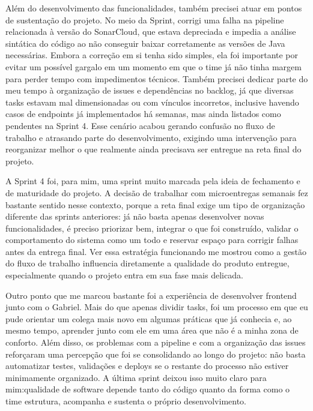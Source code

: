 \indent Além do desenvolvimento das funcionalidades, também precisei atuar em pontos de sustentação do projeto. No meio da Sprint, corrigi uma falha na pipeline relacionada à versão do SonarCloud, que estava depreciada e impedia a análise sintática do código ao não conseguir baixar corretamente as versões de Java necessárias. Embora a correção em si tenha sido simples, ela foi importante por evitar um possível gargalo em um momento em que o time já não tinha margem para perder tempo com impedimentos técnicos. Também precisei dedicar parte do meu tempo à organização de issues e dependências no backlog, já que diversas tasks estavam mal dimensionadas ou com vínculos incorretos, inclusive havendo casos de endpoints já implementados há semanas, mas ainda listados como pendentes na Sprint 4. Esse cenário acabou gerando confusão no fluxo de trabalho e atrasando parte do desenvolvimento, exigindo uma intervenção para reorganizar melhor o que realmente ainda precisava ser entregue na reta final do projeto.\par

\begin{reflection}
\indent \originaltab{}A Sprint 4 foi, para mim, uma sprint muito marcada pela ideia de fechamento e de maturidade do projeto. A decisão de trabalhar com microentregas semanais fez bastante sentido nesse contexto, porque a reta final exige um tipo de organização diferente das sprints anteriores: já não basta apenas desenvolver novas funcionalidades, é preciso priorizar bem, integrar o que foi construído, validar o comportamento do sistema como um todo e reservar espaço para corrigir falhas antes da entrega final. Ver essa estratégia funcionando me mostrou como a gestão do fluxo de trabalho influencia diretamente a qualidade do produto entregue, especialmente quando o projeto entra em sua fase mais delicada.\par

\indent Outro ponto que me marcou bastante foi a experiência de desenvolver frontend junto com o Gabriel. Mais do que apenas dividir tasks, foi um processo em que eu pude orientar um colega mais novo em algumas práticas que já conhecia e, ao mesmo tempo, aprender junto com ele em uma área que não é a minha zona de conforto. Além disso, os problemas com a pipeline e com a organização das issues reforçaram uma percepção que foi se consolidando ao longo do projeto: não basta automatizar testes, validações e deploys se o restante do processo não estiver minimamente organizado. A última sprint deixou isso muito claro para mim:\originalspace{}\originalspace{}qualidade de software depende tanto do código quanto da forma como o time estrutura, acompanha e sustenta o próprio desenvolvimento.\par

\end{reflection}
